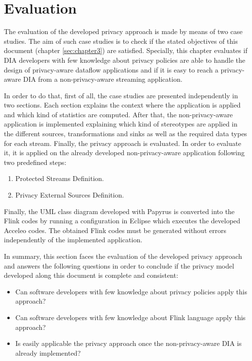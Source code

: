 \chapter[Evaluation]{Evaluation}
\label{sec:chapter5}

The evaluation of the developed privacy approach is made by means of two case studies. The aim of such case studies is to check if the stated objectives of this document (chapter \ref{sec:chapter3}) are satisfied. Specially, this chapter evaluates if DIA developers with few knowledge about privacy policies are able to handle the design of privacy-aware dataflow applications and if it is easy to reach a privacy-aware DIA from a non-privacy-aware streaming application.

In order to do that, first of all, the case studies are presented independently in two sections. Each section explains the context where the application is applied and which kind of statistics are computed. After that, the non-privacy-aware application is implemented explaining which kind of stereotypes are applied in the different sources, transformations and sinks as well as the required data types for each stream. Finally, the privacy approach is evaluated. In order to evaluate it, it is applied on the already developed non-privacy-aware application following two predefined steps:

\begin{enumerate}
\item Protected Streams Definition.
\item Privacy External Sources Definition.
\end{enumerate}

Finally, the UML class diagram developed with Papyrus is converted into the Flink codes by running a configuration in Eclipse which executes the developed Acceleo codes. The obtained Flink codes must be generated without errors independently of the implemented application.

In summary, this section faces the evaluation of the developed privacy approach and answers the following questions in order to conclude if the privacy model developed along this document is complete and consistent:

\begin{itemize}
\item Can software developers with few knowledge about privacy policies apply this approach?
\item Can software developers with few knowledge about Flink language apply this approach?
\item Is easily applicable the privacy approach once the non-privacy-aware DIA is already implemented?
\end{itemize}

